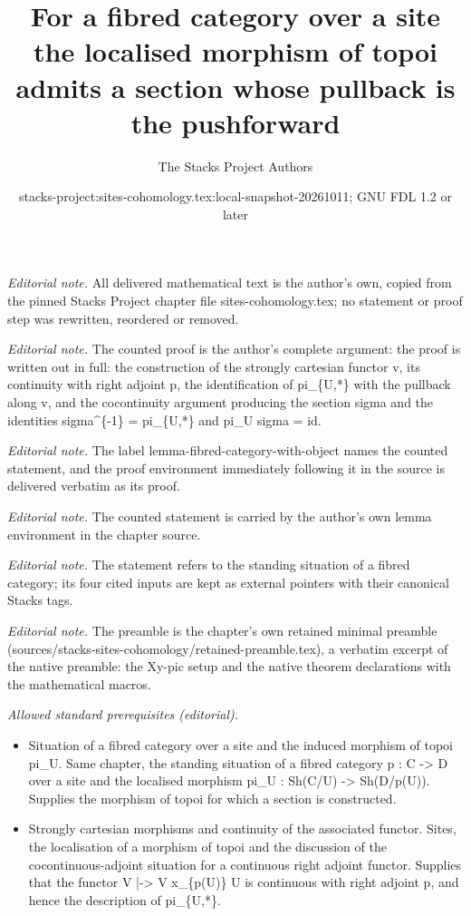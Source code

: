 \documentclass[10pt,a4paper]{amsart}
\title{For a fibred category over a site the localised morphism of topoi admits a section whose pullback is the pushforward}
\author{The Stacks Project Authors}
\date{stacks-project:sites-cohomology.tex:local-snapshot-20261011; GNU FDL 1.2 or later}
\theoremstyle{plain}
\theoremstyle{definition}
\theoremstyle{remark}
\numberwithin{equation}{subsection}
\begin{document}
\maketitle
\noindent\textit{Editorial note.} All delivered mathematical text is the author's own, copied from the pinned Stacks Project chapter file sites-cohomology.tex; no statement or proof step was rewritten, reordered or removed.\par\medskip
\noindent\textit{Editorial note.} The counted proof is the author's complete argument: the proof is written out in full: the construction of the strongly cartesian functor v, its continuity with right adjoint p, the identification of pi\_\{U,*\} with the pullback along v, and the cocontinuity argument producing the section sigma and the identities sigma\textasciicircum{}\{-1\} = pi\_\{U,*\} and pi\_U sigma = id.\par\medskip
\noindent\textit{Editorial note.} The label lemma-fibred-category-with-object names the counted statement, and the proof environment immediately following it in the source is delivered verbatim as its proof.\par\medskip
\noindent\textit{Editorial note.} The counted statement is carried by the author's own lemma environment in the chapter source.\par\medskip
\noindent\textit{Editorial note.} The statement refers to the standing situation of a fibred category; its four cited inputs are kept as external pointers with their canonical Stacks tags.\par\medskip
\noindent\textit{Editorial note.} The preamble is the chapter's own retained minimal preamble (sources/stacks-sites-cohomology/retained-preamble.tex), a verbatim excerpt of the native preamble: the Xy-pic setup and the native theorem declarations with the mathematical macros.\par\medskip
\noindent\textit{Allowed standard prerequisites (editorial).}\begin{itemize}
\item Situation of a fibred category over a site and the induced morphism of topoi pi\_U. Same chapter, the standing situation of a fibred category p : C -> D over a site and the localised morphism pi\_U : Sh(C/U) -> Sh(D/p(U)). Supplies the morphism of topoi for which a section is constructed.
\item Strongly cartesian morphisms and continuity of the associated functor. Sites, the localisation of a morphism of topoi and the discussion of the cocontinuous-adjoint situation for a continuous right adjoint functor. Supplies that the functor V |-> V x\_\{p(U)\} U is continuous with right adjoint p, and hence the description of pi\_\{U,*\}.
\end{itemize}\medskip
\end{document}
